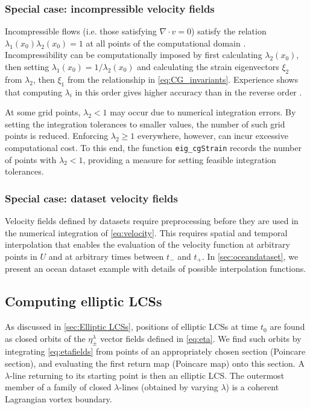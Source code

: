 \documentclass[5p]{elsarticle}
\begin{document}
\subsubsection{Special case: incompressible velocity fields}

Incompressible flows (i.e. those satisfying $\nabla \cdot v=0$) satisfy the relation $\lambda_1(x_0) \lambda_2(x_0) = 1$ at all points of the computational domain \citep{arnold89:_mathem}. Incompressibility can be computationally imposed by first calculating $\lambda_2(x_0)$, then setting $\lambda_1(x_0) = 1/\lambda_2(x_0)$ and calculating the strain eigenvectors $\xi_2$ from $\lambda_2$, then $\xi_1$ from the relationship in \cref{eq:CG_invariants}. Experience shows that computing $\lambda_i$ in this order gives higher accuracy than in the reverse order \citep{farazmand12:_comput_lagran}.

At some grid points, $\lambda_2 < 1$ may occur due to numerical integration errors. By setting the integration tolerances to smaller values, the number of such grid points is reduced. Enforcing $\lambda_2 \geq 1$ everywhere, however, can incur excessive computational cost. To this end, the function \lstinline!eig_cgStrain! records the number of points with $\lambda_2 < 1$, providing a measure for setting feasible integration tolerances.

\subsubsection{Special case: dataset velocity fields}

Velocity fields defined by datasets require preprocessing before they are used in the numerical integration of \cref{eq:velocity}. This requires spatial and temporal interpolation that enables the evaluation of the velocity function at arbitrary points in $U$ and at arbitrary times between $t_-$ and $t_+$. In \cref{sec:oceandataset}, we present an ocean dataset example with details of possible interpolation functions.

\subsection{Computing elliptic LCSs}

As discussed in \cref{sec:Elliptic LCSs}, positions of elliptic LCSs at time $t_0$ are found as closed orbits of the $\eta_\pm^\lambda$ vector fields defined in \cref{eq:eta}. We find such orbits by integrating \cref{eq:etafields} from points of an appropriately chosen section (Poincare section), and evaluating the first return map (Poincare map) onto this section. A $\lambda$-line returning to its starting point is then an elliptic LCS. The outermost member of a family of closed $\lambda$-lines (obtained by varying $\lambda$) is a coherent Lagrangian vortex boundary\citep{haller13:_coher_lagran,haller14:_adden_coher_lagran}.
\end{document}
